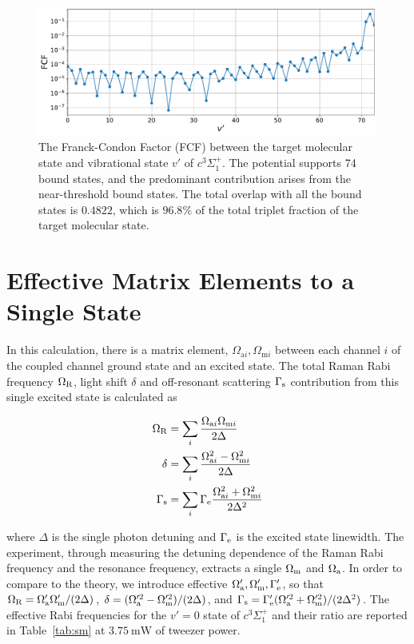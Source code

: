 \documentclass[aps,secnumarabic,amsmath,amssymb,10pt,superscriptaddress]{revtex4}
\begin{document}
\begin{figure}[ht!]
  \includegraphics[width=\textwidth]{imgs/fcf_c3sigma.pdf}
  \caption{The Franck-Condon Factor (FCF) between the target molecular state and vibrational state $v'$ of $c^3\Sigma^+_1$. The potential supports 74 bound states, and the predominant contribution arises from the near-threshold bound states. The total overlap with all the bound states is $0.4822$, which is $96.8\%$ of the total triplet fraction of the target molecular state.
    \label{f-smfcf}}
\end{figure}
\section{Effective Matrix Elements to a Single State}

In this calculation, there is a matrix element, $\Omega_{\mathrm{a}i}, \Omega_{\mathrm{m}i}$ between each channel $ i $ of the coupled channel ground state and an excited state. The total Raman Rabi frequency $ \Omega_{\rm R}$, light shift $ \delta$ and off-resonant scattering $ \Gamma_{\rm s} $ contribution from this single excited state is calculated as

\begin{align}
  \Omega_{\rm R} &= \displaystyle\sum_{i} \frac{\Omega_{\mathrm{a}i} \Omega_{\mathrm{m}i}}{2\Delta} \\
  \delta &= \displaystyle\sum_{i} \frac{\Omega_{\mathrm{a}i}^2 - \Omega_{\mathrm{m}i}^2}{2\Delta} \\
  \Gamma_{\rm s} &= \displaystyle\sum_{i} \Gamma_{\rm e} \frac{\Omega_{\mathrm{a}i}^2 + \Omega_{\mathrm{m}i}^2}{2\Delta^2}
\end{align}

where $ \Delta $ is the single photon detuning and $ \Gamma_{\rm e} $ is the excited state linewidth. The experiment, through measuring the detuning dependence of the Raman Rabi frequency and the resonance frequency, extracts a single $ \Omega_{\rm m} $ and $ \Omega_{\rm a} $. In order to compare to the theory, we introduce effective $ \Omega_{\rm a}', \Omega_{\rm m}', \Gamma_{\rm e}'$, so that $ \Omega_{\rm R} = \Omega_{\rm a}'\Omega_{\rm m}'/(2\Delta) $, $\delta = (\Omega_{\rm a}'^2 - \Omega_{\rm m}'^2)/(2\Delta) $, and $\Gamma_{\rm s} = \Gamma_{\rm e}'(\Omega_{\rm a}'^2 + \Omega_{\rm m}'^2)/(2\Delta^2) $. The effective Rabi frequencies for the $v' = 0$ state of $ c^3\Sigma^+_1$ and their ratio are reported in Table~\ref{tab:sm} at $3.75~\mathrm{mW}$ of tweezer power.
\end{document}
